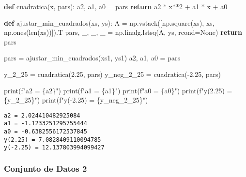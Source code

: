 \documentclass[
  letterpaper,
  DIV=11,
  numbers=noendperiod]{scrartcl}
\newenvironment{Shaded}{\begin{snugshade}}{\end{snugshade}}
\newcommand{\BuiltInTok}[1]{\textcolor[rgb]{0.00,0.23,0.31}{#1}}
\newcommand{\ControlFlowTok}[1]{\textcolor[rgb]{0.00,0.23,0.31}{\textbf{#1}}}
\newcommand{\DecValTok}[1]{\textcolor[rgb]{0.68,0.00,0.00}{#1}}
\newcommand{\FloatTok}[1]{\textcolor[rgb]{0.68,0.00,0.00}{#1}}
\newcommand{\KeywordTok}[1]{\textcolor[rgb]{0.00,0.23,0.31}{\textbf{#1}}}
\newcommand{\NormalTok}[1]{\textcolor[rgb]{0.00,0.23,0.31}{#1}}
\newcommand{\OperatorTok}[1]{\textcolor[rgb]{0.37,0.37,0.37}{#1}}
\newcommand{\SpecialCharTok}[1]{\textcolor[rgb]{0.37,0.37,0.37}{#1}}
\newcommand{\SpecialStringTok}[1]{\textcolor[rgb]{0.13,0.47,0.30}{#1}}
\newcommand{\VariableTok}[1]{\textcolor[rgb]{0.07,0.07,0.07}{#1}}
\begin{document}
\begin{Shaded}
\begin{Highlighting}[]
\KeywordTok{def}\NormalTok{ cuadratica(x, pars):}
\NormalTok{    a2, a1, a0 }\OperatorTok{=}\NormalTok{ pars}
    \ControlFlowTok{return}\NormalTok{ a2 }\OperatorTok{*}\NormalTok{ x}\OperatorTok{**}\DecValTok{2} \OperatorTok{+}\NormalTok{ a1 }\OperatorTok{*}\NormalTok{ x }\OperatorTok{+}\NormalTok{ a0}

\KeywordTok{def}\NormalTok{ ajustar\_min\_cuadrados(xs, ys):}
\NormalTok{    A }\OperatorTok{=}\NormalTok{ np.vstack([np.square(xs), xs, np.ones(}\BuiltInTok{len}\NormalTok{(xs))]).T}
\NormalTok{    pars, \_, \_, \_ }\OperatorTok{=}\NormalTok{ np.linalg.lstsq(A, ys, rcond}\OperatorTok{=}\VariableTok{None}\NormalTok{)}
    \ControlFlowTok{return}\NormalTok{ pars}

\NormalTok{pars }\OperatorTok{=}\NormalTok{ ajustar\_min\_cuadrados(xs1, ys1)}
\NormalTok{a2, a1, a0 }\OperatorTok{=}\NormalTok{ pars}

\NormalTok{y\_2\_25 }\OperatorTok{=}\NormalTok{ cuadratica(}\FloatTok{2.25}\NormalTok{, pars)}
\NormalTok{y\_neg\_2\_25 }\OperatorTok{=}\NormalTok{ cuadratica(}\OperatorTok{{-}}\FloatTok{2.25}\NormalTok{, pars)}

\BuiltInTok{print}\NormalTok{(}\SpecialStringTok{f"a2 = }\SpecialCharTok{\{}\NormalTok{a2}\SpecialCharTok{\}}\SpecialStringTok{"}\NormalTok{)}
\BuiltInTok{print}\NormalTok{(}\SpecialStringTok{f"a1 = }\SpecialCharTok{\{}\NormalTok{a1}\SpecialCharTok{\}}\SpecialStringTok{"}\NormalTok{)}
\BuiltInTok{print}\NormalTok{(}\SpecialStringTok{f"a0 = }\SpecialCharTok{\{}\NormalTok{a0}\SpecialCharTok{\}}\SpecialStringTok{"}\NormalTok{)}
\BuiltInTok{print}\NormalTok{(}\SpecialStringTok{f"y(2.25) = }\SpecialCharTok{\{}\NormalTok{y\_2\_25}\SpecialCharTok{\}}\SpecialStringTok{"}\NormalTok{)}
\BuiltInTok{print}\NormalTok{(}\SpecialStringTok{f"y({-}2.25) = }\SpecialCharTok{\{}\NormalTok{y\_neg\_2\_25}\SpecialCharTok{\}}\SpecialStringTok{"}\NormalTok{)}
\end{Highlighting}
\end{Shaded}

\begin{verbatim}
a2 = 2.024410482925084
a1 = -1.1233251295755444
a0 = -0.6382556172537845
y(2.25) = 7.0828409110094785
y(-2.25) = 12.137803994099427
\end{verbatim}

\subsubsection{Conjunto de Datos 2}\label{conjunto-de-datos-2}
\end{document}
